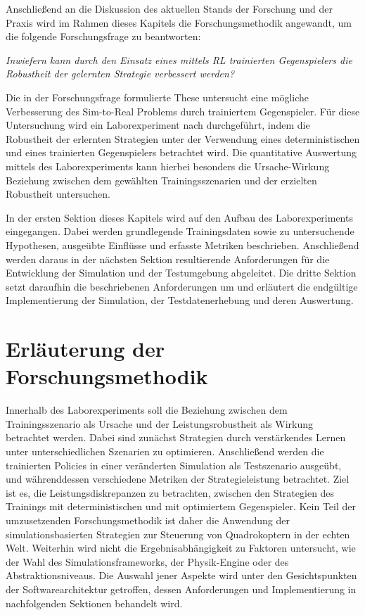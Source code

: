 Anschließend an die Diskussion des aktuellen Stands der Forschung und der Praxis wird im Rahmen dieses Kapitels die Forschungsmethodik angewandt, um die folgende Forschungsfrage zu beantworten:

\textit{Inwiefern kann durch den Einsatz eines mittels RL trainierten Gegenspielers die Robustheit der gelernten Strategie verbessert werden?}

Die in der Forschungsfrage formulierte These untersucht eine mögliche Verbesserung des Sim-to-Real Problems durch trainiertem Gegenspieler.
Für diese Untersuchung wird ein Laborexperiment nach \cite[]{Recker.2021} durchgeführt, indem die Robustheit der erlernten Strategien unter der Verwendung eines deterministischen und eines trainierten Gegenspielers betrachtet wird. 
Die quantitative Auswertung mittels des Laborexperiments kann hierbei besonders die Ursache-Wirkung Beziehung zwischen dem gewählten Trainingsszenarien und der erzielten Robustheit untersuchen.

In der ersten Sektion dieses Kapitels wird auf den Aufbau des Laborexperiments eingegangen.
Dabei werden grundlegende Trainingsdaten sowie zu untersuchende Hypothesen, ausgeübte Einflüsse und erfasste Metriken beschrieben.
Anschließend werden daraus in der nächsten Sektion resultierende Anforderungen für die Entwicklung der Simulation und der Testumgebung abgeleitet. 
Die dritte Sektion setzt daraufhin die beschriebenen Anforderungen um und erläutert die endgültige Implementierung der Simulation, der Testdatenerhebung und deren Auswertung.

\section{Erläuterung der Forschungsmethodik}

Innerhalb des Laborexperiments soll die Beziehung zwischen dem Trainingsszenario als Ursache und der Leistungsrobustheit als Wirkung betrachtet werden.
Dabei sind zunächst Strategien durch verstärkendes Lernen unter unterschiedlichen Szenarien zu optimieren. 
Anschließend werden die trainierten Policies in einer veränderten Simulation als Testszenario ausgeübt, und währenddessen verschiedene Metriken der Strategieleistung betrachtet.
Ziel ist es, die Leistungsdiskrepanzen zu betrachten, zwischen den Strategien des Trainings mit deterministischen und mit optimiertem Gegenspieler.
Kein Teil der umzusetzenden Forschungsmethodik ist daher die Anwendung der simulationsbasierten Strategien zur Steuerung von Quadrokoptern in der echten Welt. 
Weiterhin wird nicht die Ergebnisabhängigkeit zu Faktoren untersucht, wie der Wahl des Simulationsframeworks, der Physik-Engine oder des Abstraktionsniveaus.
Die Auswahl jener Aspekte wird unter den Gesichtspunkten der Softwarearchitektur getroffen, dessen Anforderungen und Implementierung in nachfolgenden Sektionen behandelt wird.

